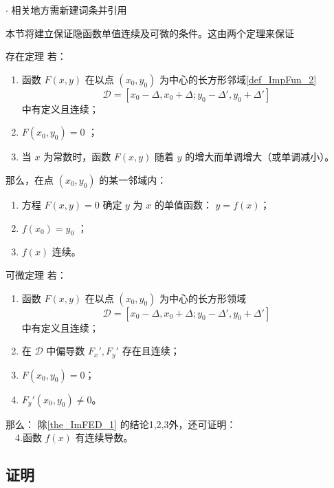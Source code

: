 
\begin{issues}
$\cdot$ 相关地方需新建词条并引用
\end{issues}

本节将建立保证隐函数单值连续及可微的条件。这由两个定理来保证
\begin{theorem}{存在定理}\label{the_ImFED_1}
若：\begin{enumerate}
\item 函数 $F(x,y)$ 在以点 $(x_0,y_0)$ 为中心的长方形邻域\autoref{def_ImpFun_2}~
\begin{equation}
\mathcal{D}=[x_0-\Delta,x_0+\Delta;y_0-\Delta',y_0+\Delta']
\end{equation}
中有定义且连续；
\item $F(x_0,y_0)=0$ ；
\item 当 $x$ 为常数时，函数 $F(x,y)$ 随着 $y$ 的增大而单调增大（或单调减小）。
\end{enumerate}
那么，在点 $(x_0,y_0)$ 的某一邻域内：
\begin{enumerate}
\item 方程 $F(x,y)=0$ 确定 $y$ 为 $x$ 的单值函数： $y=f(x)$；
\item $f(x_0)=y_0$ ；
\item $f(x)$ 连续。
\end{enumerate}
\end{theorem}

\begin{theorem}{可微定理}
若：
\begin{enumerate}
\item 函数 $F(x,y)$ 在以点 $(x_0,y_0)$ 为中心的长方形领域
\begin{equation}
\mathcal{D}=[x_0-\Delta,x_0+\Delta;y_0-\Delta',y_0+\Delta']
\end{equation}
中有定义且连续；
\item 在 $\mathcal{D}$ 中偏导数 $F_x',F_y'$ 存在且连续；
\item $F(x_0,y_0)=0$；
\item $F_y'(x_0,y_0)\neq0$。
\end{enumerate}
那么：
除\autoref{the_ImFED_1} 的结论1,2,3外，还可证明：\\
$\quad$4.函数 $f(x)$ 有连续导数。

\end{theorem}
\subsection{证明}
